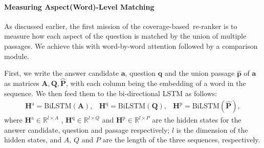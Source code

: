\documentclass{article} \usepackage{iclr2018_conference,times}
\def \union {coverage-based}
\begin{document}
\paragraph{Measuring Aspect(Word)-Level Matching}
As discussed earlier, the first mission of the \union\ re-ranker is to measure how each aspect of the question is matched by the union of multiple passages. We achieve this with word-by-word attention followed by a comparison module.

First, we write the answer candidate $\mathbf{a}$, question $\mathbf{q}$ and the union passage $\mathbf{\hat{p}}$ of $\mathbf{a}$ as matrices $\mathbf{A},\mathbf{Q},\mathbf{\hat{P}}$, with each column being the embedding of a word in the sequence. We then feed them to the bi-directional LSTM as follows:
\begin{equation}
\begin{matrix}
\mathbf{H}^{\text{a}} = \text{BiLSTM} (\mathbf{A}), & \mathbf{H}^{\text{q}} =\text{BiLSTM} (\mathbf{Q}),  & \mathbf{H}^{\text{p}} =\text{BiLSTM} (\mathbf{\hat{P}}), 
\end{matrix}
\label{eqn:preprocess}
\end{equation}
where $\mathbf{H}^{\text{a}} \in \mathbb{R}^{l\times A}$ , $ \mathbf{H}^{\text{q}}\in \mathbb{R}^{l\times Q}$ and  $ \mathbf{H}^{\text{p}}\in \mathbb{R}^{l\times P}$ are the hidden states for the answer candidate, question and passage respectively;
$l$ is the dimension of the hidden states, and $A$, $Q$ and $P$ are the length of the three sequences, respectively. 
\end{document}
